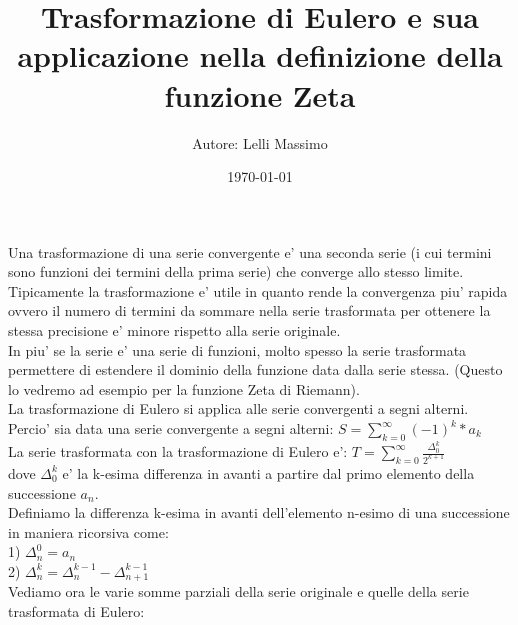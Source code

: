 \documentclass[12pt,a4paper]{article}
\begin{document}
\title{\textbf{Trasformazione di Eulero e sua applicazione nella definizione della funzione Zeta}}
\author{Autore: Lelli Massimo}
\date{\today}
\maketitle

\begin{flushleft}
\vspace{10mm}

Una trasformazione di una serie convergente e' una seconda serie (i cui termini sono funzioni dei termini della prima serie) che converge allo stesso limite.\\
\vspace{5mm}
Tipicamente la trasformazione e' utile in quanto rende la convergenza piu' rapida ovvero il numero di termini da sommare nella serie trasformata per ottenere la stessa precisione e' minore rispetto alla serie originale.\\
\vspace{5mm}
In piu' se la serie e' una serie di funzioni, molto spesso la serie trasformata permettere di estendere il dominio della funzione data dalla serie stessa. (Questo lo vedremo ad esempio per la funzione Zeta di Riemann).\\
\vspace{5mm}
La trasformazione di Eulero si applica alle serie convergenti a segni alterni.\\
\vspace{5mm}
Percio' sia data una serie convergente a segni alterni: $S=\sum_{k=0}^{\infty}(-1)^k*a_k$\\
\vspace{5mm}
La serie trasformata con la trasformazione di Eulero e':  $T=\sum_{k=0}^{\infty}\frac{\Delta _0^k}{2^{k+1}}$\\
dove $\Delta_0^k$ e' la k-esima differenza in avanti a partire dal primo elemento della successione $a_n$.\\
\vspace{5mm}
Definiamo la differenza k-esima in avanti dell'elemento n-esimo di una successione in maniera ricorsiva come:\\
1) $\Delta_n^0 = a_n$\\
2) $\Delta_n^k = \Delta_{n}^{k-1} - \Delta_{n+1}^{k-1}$\\
\vspace{5mm}
Vediamo ora le varie somme parziali della serie originale e quelle della serie trasformata di Eulero:\\

\end{flushleft}
\end{document}
